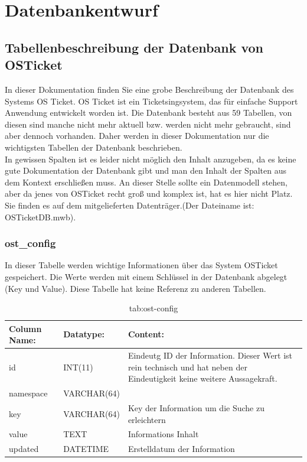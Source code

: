 \newpage
\section{Datenbankentwurf}
\def \currentAuthor{Elias Gabl}

\subsection{Tabellenbeschreibung der Datenbank von OSTicket}

In dieser Dokumentation finden Sie eine grobe Beschreibung der Datenbank des Systems OS Ticket. OS Ticket ist ein Ticketsingsystem, das für einfache Support Anwendung entwickelt worden ist. Die Datenbank besteht aus 59 Tabellen, von diesen sind manche nicht mehr aktuell bzw. werden nicht mehr gebraucht, sind aber dennoch vorhanden. Daher werden in dieser Dokumentation nur die wichtigsten Tabellen der Datenbank beschrieben.\\
In gewissen Spalten ist es leider nicht möglich den Inhalt anzugeben, da es keine gute Dokumentation der Datenbank gibt und man den Inhalt der Spalten aus dem Kontext erschließen muss.
\newline
\newline
An dieser Stelle sollte ein Datenmodell stehen, aber da jenes von OSTicket recht groß und komplex ist, hat es hier nicht Platz. Sie finden es auf dem mitgelieferten Datenträger.(Der Dateiname ist: OSTicketDB.mwb).


\newpage

\subsubsection{ost\_config}

In dieser Tabelle werden wichtige Informationen über das System OSTicket gespeichert. Die Werte werden mit einem Schlüssel in der Datenbank abgelegt (Key und Value).
Diese Tabelle hat keine Referenz zu anderen Tabellen.

\begin{table}[h]
	\begin{tabular}{|p{3.5cm}|p{4cm}|p{6.2cm}|}
		\hline
		\textbf{Column Name:} & \textbf{Datatype:} & \textbf{Content:}\\
		\hline
		id & INT(11) & Eindeutg ID der Information. Dieser Wert ist rein technisch und hat  neben der Eindeutigkeit keine weitere 
		Aussagekraft. \\
		\hline
		namespace & VARCHAR(64) & \\
		\hline
		key & VARCHAR(64) & Key der Information um die Suche zu erleichtern\\
		\hline
		value & TEXT & Informations Inhalt\\
		\hline
		updated & DATETIME & Erstelldatum der Information\\
		\hline
	\end{tabular}
	\caption{tab:ost-config}
\end{table}
\label{tab:ost_config}
\newpage


